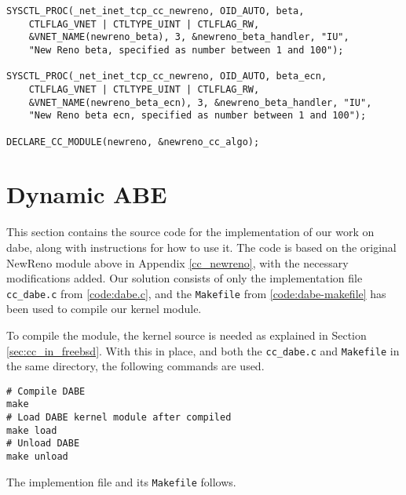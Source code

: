 \begin{code}
\begin{verbatim}
SYSCTL_PROC(_net_inet_tcp_cc_newreno, OID_AUTO, beta,
    CTLFLAG_VNET | CTLTYPE_UINT | CTLFLAG_RW,
    &VNET_NAME(newreno_beta), 3, &newreno_beta_handler, "IU",
    "New Reno beta, specified as number between 1 and 100");

SYSCTL_PROC(_net_inet_tcp_cc_newreno, OID_AUTO, beta_ecn,
    CTLFLAG_VNET | CTLTYPE_UINT | CTLFLAG_RW,
    &VNET_NAME(newreno_beta_ecn), 3, &newreno_beta_handler, "IU",
    "New Reno beta ecn, specified as number between 1 and 100");

DECLARE_CC_MODULE(newreno, &newreno_cc_algo);
\end{verbatim}
\label{code:newreno.c}
\end{code}









\section{Dynamic ABE}

This section contains the source code for the implementation of our work on \gls{dabe}, along with instructions for how to use it. The code is based on the original NewReno module above in Appendix \ref{cc_newreno}, with the necessary modifications added. Our solution consists of only the implementation file \lstinline{cc_dabe.c} from \ref{code:dabe.c}, and the \lstinline{Makefile} from \ref{code:dabe-makefile} has been used to compile our kernel module.

To compile the module, the kernel source is needed as explained in Section \ref{sec:cc_in_freebsd}. With this in place, and both the \lstinline{cc_dabe.c} and \lstinline{Makefile} in the same directory, the following commands are used.

\begin{verbatim}
# Compile DABE
make
# Load DABE kernel module after compiled
make load
# Unload DABE
make unload
\end{verbatim}
The implemention file and its \lstinline{Makefile} follows.

